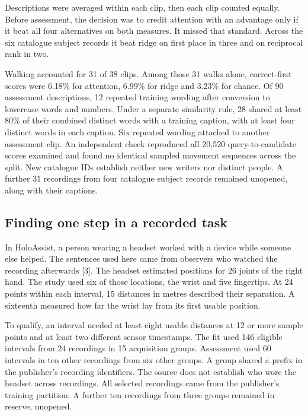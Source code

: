\noindent Descriptions were averaged within each clip, then each clip counted equally. Before assessment, the decision was to credit attention with an advantage only if it beat all four alternatives on both measures. It missed that standard. Across the six catalogue subject records it beat ridge on first place in three and on reciprocal rank in two.\par

\noindent Walking accounted for 31 of 38 clips. Among those 31 walks alone, correct-first scores were 6.18\% for attention, 6.99\% for ridge and 3.23\% for chance. Of 90 assessment descriptions, 12 repeated training wording after conversion to lowercase words and numbers. Under a separate similarity rule, 28 shared at least 80\% of their combined distinct words with a training caption, with at least four distinct words in each caption. Six repeated wording attached to another assessment clip. An independent check reproduced all 20,520 query-to-candidate scores examined and found no identical sampled movement sequences across the split. New catalogue IDs establish neither new writers nor distinct people. A further 31 recordings from four catalogue subject records remained unopened, along with their captions.\par

\subsection*{Finding one step in a recorded task}

\noindent In HoloAssist, a person wearing a headset worked with a device while someone else helped. The sentences used here came from observers who watched the recording afterwards [3]. The headset estimated positions for 26 joints of the right hand. The study used six of those locations, the wrist and five fingertips. At 24 points within each interval, 15 distances in metres described their separation. A sixteenth measured how far the wrist lay from its first usable position.\par

\noindent To qualify, an interval needed at least eight usable distances at 12 or more sample points and at least two different sensor timestamps. The fit used 146 eligible intervals from 24 recordings in 15 acquisition groups. Assessment used 60 intervals in ten other recordings from six other groups. A group shared a prefix in the publisher's recording identifiers. The source does not establish who wore the headset across recordings. All selected recordings came from the publisher's training partition. A further ten recordings from three groups remained in reserve, unopened.\par

